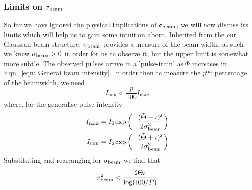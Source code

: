 \documentclass[/home/greg/Thesis/main/main.tex]{subfiles}
\begin{document}
\subsubsection{Limits on $\sigma_{\textrm{beam}}$}
So far we have ignored the physical implications of $\sigma_{\textrm{beam}}$, we will now 
discuss its limits which will help us to gain some intuition about. Inherited
from the our Gaussian beam structure, $\sigma_{\textrm{beam}}$ provides a measure of the 
beam width, as such we know $\sigma_{\textrm{beam}} > 0$ in order for us to observe it, but 
the upper limit is somewhat more subtle. The observed pulses arrive in a 
'pulse-train' as $\Phi$ increases in Eqn.~\eqref{eqn: General beam intensity}. 
In order then to measure the $p^{\textrm{rm}}$ percentage of the beamwidth, we
need
\begin{equation}
I_\mathrm{min} < \frac{p}{100}I_\mathrm{max}
\end{equation}
where, for the generalise pulse intensity
\begin{align}
I_\mathrm{max} & = I_{0} \exp\left(-\frac{(\tilde{\Theta} - \iota)^{2}}{2\sigma_{\textrm{beam}}^{2}}\right) \\
I_\mathrm{min} & = I_{0} \exp\left(-\frac{(\tilde{\Theta} + \iota)^{2}}{2\sigma_{\textrm{beam}}^{2}}\right)
\end{align}
Substituting and rearranging for $\sigma_{\textrm{beam}}$ we find that
\begin{equation}
\sigma_{\textrm{beam}}^{2} < \frac{2\tilde{\Theta}\iota}{\log(100/P)}
\end{equation}

\biblio
\end{document}
